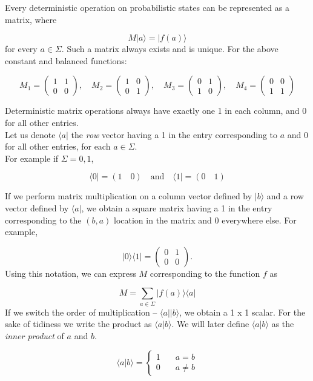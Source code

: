 \documentclass[svgnames]{article}     %
\begin{document}
Every deterministic operation on probabilistic states can be represented as a matrix, where

\[
M |a\rangle = |f(a)\rangle 
\] \vspace{5px}
for every $a \in \Sigma$. Such a matrix always exists and is unique. For the above constant and balanced functions: 

\[
M_1 = \begin{pmatrix}
  1 & 1 \\ 0 & 0
\end{pmatrix}, \quad M_2 = \begin{pmatrix}
  1 & 0 \\ 0 & 1
\end{pmatrix}, \quad M_3 = \begin{pmatrix}
  0 & 1 \\ 1 & 0
\end{pmatrix}, \quad M_4 = \begin{pmatrix}
  0 & 0 \\ 1 & 1
\end{pmatrix} \] \vspace{5px}

Deterministic matrix operations always have exactly one 1 in each column, and 0 for all other entries. \\

Let us denote $\langle a |$ the \textit{row} vector having a 1 in the entry corresponding to $a$ and 0 for all other entries, for each $a \in \Sigma$. \\

For example if $\Sigma = {0, 1}$, 

\[
  \langle 0 | = ( 1 \quad 0 ) \quad \text{and} \quad \langle 1 | = (0 \quad 1) \] \vspace{5px}

If we perform matrix multiplication on a column vector defined by $|b\rangle$ and a row vector defined by $\langle a |$, we obtain a square matrix having a 1 in the entry corresponding to the $(b, a)$ location in the matrix and 0 everywhere else. For example, 

\[
  |0\rangle\langle 1 | = \begin{pmatrix}
    0 & 1 \\ 0 & 0
\end{pmatrix}.  \] \vspace{5px}
Using this notation, we can express $M$ corresponding to the function $f$ as 

\[
  M = \sum_{a \in \Sigma} | f(a)\rangle\langle a |
\] \vspace{5px}
If we switch the order of multiplication -- $\langle a || b\rangle$, we obtain a 1 x 1 scalar. For the sake of tidiness we write the product as $\langle a | b \rangle$. We will later define $\langle a | b \rangle$ as the \textit{inner product} of $a $ and $b$.  

 \[
\langle a | b \rangle = \begin{cases}
  1 \quad &a=b \\ 0 \quad &a\neq b
\end{cases} \] \vspace{5px}
\end{document}
